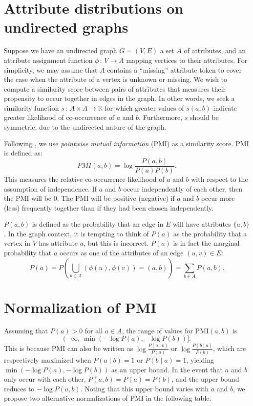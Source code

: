 \documentclass[11pt, oneside, fleqn]{article}   	%
\theoremstyle{plain}
\newcommand{\given}{\; | \;}
\newcommand{\st}{\, : \,}
\newcommand{\reals}{\mathbb{R}}
\begin{document}
\section{Attribute distributions on undirected graphs}
Suppose we have an undirected graph $G = (V, E)$ a set $A$ of attributes, and an attribute assignment function $\phi \st V \rightarrow A$ mapping vertices to their attributes.  For simplicity, we may assume that $A$ contains a ``missing'' attribute token to cover the case when the attribute of a vertex is unknown or missing.  We wish to compute a similarity score between pairs of attributes that measures their propensity to occur together in edges in the graph.  In other words, we seek a similarity function $s \st A \times A \rightarrow \reals$ for which greater values of $s(a, b)$ indicate greater likelihood of co-occurrence of $a$ and $b$.  Furthermore, $s$ should be symmetric, due to the undirected nature of the graph.

Following \cite{nameLocClustering}, we use \textit{pointwise mutual information} (PMI) as a similarity score.  PMI is defined as:
$$ PMI(a, b) = \log \frac{P(a, b)}{P(a) P(b)}. $$
This measures the relative co-occurrence likelihood of $a$ and $b$ with respect to the assumption of independence.  If $a$ and $b$ occur independently of each other, then the PMI will be 0.  The PMI will be positive (negative) if $a$ and $b$ occur more (less) frequently together than if they had been chosen independently.

$P(a, b)$ is defined as the probability that an edge in $E$ will have attributes $\{a, b\}$.  In the graph context, it is tempting to think of $P(a)$ as the probability that a vertex in $V$ has attribute $a$, but this is incorrect.  $P(a)$ is in fact the marginal probability that $a$ occurs as one of the attributes of an edge $(u, v) \in E$:
$$ P(a) = P \displaystyle \left ( \bigcup_{b \in A} (\phi(u), \phi(v)) = (a, b) \right ) = \sum_{b \in A} P(a, b). $$

\section{Normalization of PMI}
Assuming that $P(a) > 0$ for all $a \in A$, the range of values for PMI$(a, b)$ is
$$(-\infty, \, \min(-\log P(a), -\log P(b))]. $$
This is because PMI can also be written as $\log \frac{P(a \given b)}{P(a)}$ or $\log \frac{P(b \given a)}{P(b)}$, which are respectively maximized when $P(a \given b) = 1$ or $P(b \given a) = 1$, yielding $\min(-\log P(a), -\log P(b))$ as an upper bound.  In the event that $a$ and $b$ only occur with each other, $P(a, b) = P(a) = P(b)$, and the upper bound reduces to $-\log P(a, b)$.  Noting that this upper bound varies with $a$ and $b$, we propose two alternative normalizations of PMI in the following table.
\end{document}
